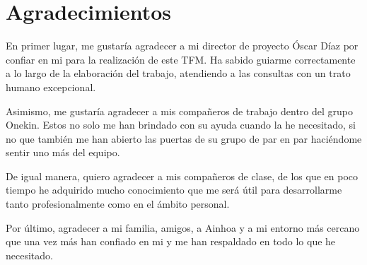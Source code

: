 \chapter{Agradecimientos}

En primer lugar, me gustaría agradecer a mi director de proyecto Óscar Díaz por confiar en mi para la realización de este TFM. Ha sabido guiarme correctamente a lo largo de la elaboración del trabajo, atendiendo a las consultas con un trato humano excepcional.

Asimismo, me gustaría agradecer a mis compañeros de trabajo dentro del grupo Onekin. Estos no solo me han brindado con su ayuda cuando la he necesitado, si no que también me han abierto las puertas de su grupo de par en par haciéndome sentir uno más del equipo.

De igual manera, quiero agradecer a mis compañeros de clase, de los que en poco tiempo he adquirido mucho conocimiento que me será útil para desarrollarme tanto profesionalmente como en el ámbito personal.

Por último, agradecer a mi familia, amigos, a Ainhoa y a mi entorno más cercano que una vez más han confiado en mi y me han respaldado en todo lo que he necesitado.